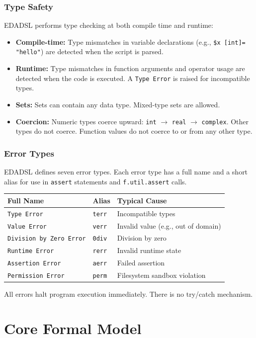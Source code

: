 \section{Type Safety}
EDADSL performs type checking at both compile time and runtime:

\begin{itemize}
\item \textbf{Compile-time:} Type mismatches in variable declarations (e.g., \texttt{\$x [int]= "hello"}) are detected when the script is parsed.
\item \textbf{Runtime:} Type mismatches in function arguments and operator usage are detected when the code is executed. A \texttt{Type Error} is raised for incompatible types.
\item \textbf{Sets:} Sets can contain any data type. Mixed-type sets are allowed.
\item \textbf{Coercion:} Numeric types coerce upward: \texttt{int} $\to$ \texttt{real} $\to$ \texttt{complex}. Other types do not coerce. Function values do not coerce to or from any other type.
\end{itemize}

\section{Error Types}
EDADSL defines seven error types. Each error type has a full name and a short alias for use in \texttt{assert} statements and \texttt{f.util.assert} calls.

\begin{center}
\begin{tabular}{lll}
Full Name & Alias & Typical Cause \\ \hline
\texttt{Type Error} & \texttt{terr} & Incompatible types \\
\texttt{Value Error} & \texttt{verr} & Invalid value (e.g., out of domain) \\
\texttt{Division by Zero Error} & \texttt{0div} & Division by zero \\
\texttt{Runtime Error} & \texttt{rerr} & Invalid runtime state \\
\texttt{Assertion Error} & \texttt{aerr} & Failed assertion \\
\texttt{Permission Error} & \texttt{perm} & Filesystem sandbox violation \\
\end{tabular}
\end{center}

All errors halt program execution immediately. There is no try/catch mechanism.\part{Core Formal Model}
